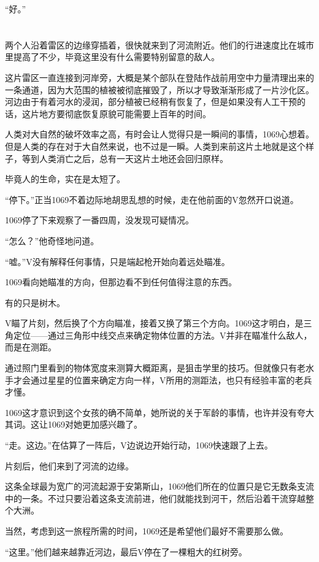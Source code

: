 “好。”

\section*{}

两个人沿着雷区的边缘穿插着，很快就来到了河流附近。他们的行进速度比在城市里提高了不少，毕竟这里没有什么需要特别留意的敌人。

这片雷区一直连接到河岸旁，大概是某个部队在登陆作战前用空中力量清理出来的一条通道，因为大范围的植被被彻底摧毁了，所以才导致渐渐形成了一片沙化区。河边由于有着河水的浸润，部分植被已经稍有恢复了，但是如果没有人工干预的话，这片地方要彻底恢复原貌可能需要上百年的时间。

人类对大自然的破坏效率之高，有时会让人觉得只是一瞬间的事情，1069心想着。但是人类的存在对于大自然来说，也不过是一瞬。人类到来前这片土地就是这个样子，等到人类消亡之后，总有一天这片土地还会回归原样。

毕竟人的生命，实在是太短了。

“停下。”正当1069不着边际地胡思乱想的时候，走在他前面的V忽然开口说道。

1069停了下来观察了一番四周，没发现可疑情况。

“怎么？”他奇怪地问道。

“嘘。”V没有解释任何事情，只是端起枪开始向着远处瞄准。

1069看向她瞄准的方向，但那边看不到任何值得注意的东西。

有的只是树木。

V瞄了片刻，然后换了个方向瞄准，接着又换了第三个方向。1069这才明白，是三角定位——通过三角形中线交点来确定物体位置的方法。V并非在瞄准什么敌人，而是在测距。

通过照门里看到的物体宽度来测算大概距离，是狙击学里的技巧。但就像只有老水手才会通过星星的位置来确定方向一样，V所用的测距法，也只有经验丰富的老兵才懂。

1069这才意识到这个女孩的确不简单，她所说的关于军龄的事情，也许并没有夸大其词。这让1069对她更加感兴趣了。

“走。这边。”在估算了一阵后，V边说边开始行动，1069快速跟了上去。

片刻后，他们来到了河流的边缘。

这条全球最为宽广的河流起源于安第斯山，1069他们所在的位置只是它无数条支流中的一条。不过只要沿着这条支流前进，他们就能找到河干，然后沿着干流穿越整个大洲。

当然，考虑到这一旅程所需的时间，1069还是希望他们最好不需要那么做。

“这里。”他们越来越靠近河边，最后V停在了一棵粗大的红树旁。

